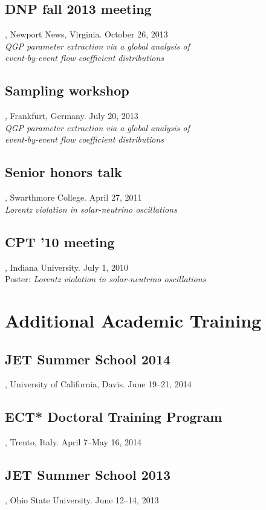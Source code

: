 \documentclass[letterpaper,10pt]{article}
\begin{document}
\subsection{DNP fall 2013 meeting}, Newport News, Virginia. \hfill October 26, 2013 \\
\emph{QGP parameter extraction via a global analysis of \\ event-by-event flow coefficient distributions}

\subsection{Sampling workshop}, Frankfurt, Germany. \hfill July 20, 2013 \\
\emph{QGP parameter extraction via a global analysis of \\ event-by-event flow coefficient distributions}

\subsection{Senior honors talk}, Swarthmore College. \hfill April 27, 2011 \\
\emph{Lorentz violation in solar-neutrino oscillations}

\subsection{CPT '10 meeting}, Indiana University. \hfill July 1, 2010 \\
Poster: \emph{Lorentz violation in solar-neutrino oscillations}



\section{Additional Academic Training}

\subsection{JET Summer School 2014}, University of California, Davis. \hfill June 19--21, 2014

\subsection{ECT* Doctoral Training Program}, Trento, Italy. \hfill April 7--May 16, 2014

\subsection{JET Summer School 2013}, Ohio State University. \hfill June 12--14, 2013
\end{document}

